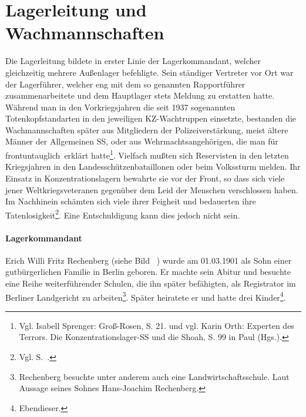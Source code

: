 \documentclass[a4paper,12pt,ngerman,
]{nisebook}
\begin{document}
\section{Lagerleitung und Wachmannschaften}
Die Lagerleitung bildete in erster Linie der Lagerkommandant, welcher gleichzeitig mehrere Außenlager befehligte. Sein ständiger Vertreter vor Ort war der Lagerführer, welcher eng mit dem so genannten Rapportführer zusammenarbeitete und dem Hauptlager stets Meldung zu erstatten hatte.
~\newline
Während man in den Vorkriegsjahren die seit 1937 sogenannten Totenkopfstandarten in den jeweiligen KZ-Wachtruppen einsetzte, bestanden die Wachmannschaften später aus Mitgliedern der Polizeiverstärkung, meist ältere Männer der Allgemeinen SS, oder aus Wehrmachtsangehörigen, die man für \glqq frontuntauglich\grqq~erklärt hatte\footnote{Vgl. Isabell Sprenger: Groß-Rosen, S. 21. und vgl. Karin Orth: \glqq Experten des Terrors. Die Konzentrationslager-SS und die Shoah\grqq, S. 99 in Paul (Hgs.).}. Vielfach mußten sich Reservisten in den letzten Kriegsjahren in den Landesschützenbataillonen oder beim Volkssturm melden. Ihr Einsatz in Konzentrationslagern bewahrte sie vor der Front, so dass sich viele jener Weltkriegsveteranen gegenüber dem Leid der Menschen verschlossen haben. Im Nachhinein schämten sich viele ihrer Feigheit und bedauerten ihre Tatenlosigkeit\footnote{Vgl. S.~\pageref{kotter}.}. Eine Entschuldigung kann dies jedoch nicht sein.\newline

\paragraph{Lagerkommandant}
Erich Willi Fritz Rechenberg (siehe Bild ~) wurde am 01.03.1901 als Sohn einer gutbürgerlichen Familie in Berlin geboren. Er machte sein Abitur und besuchte eine Reihe weiterführender Schulen, die ihn später befähigten, als Registrator im Berliner Landgericht zu arbeiten\footnote{Rechenberg besuchte unter anderem auch eine Landwirtschaftsschule. Laut Aussage seines Sohnes Hans-Joachim Rechenberg.}. Später heiratete er und hatte drei Kinder\footnote{Ebendieser.}.

\end{document}
